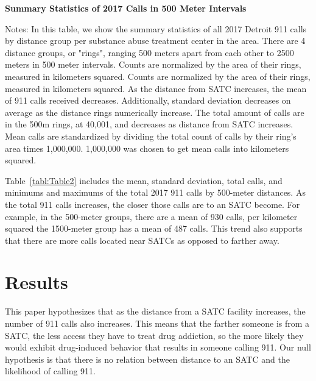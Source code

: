 \documentclass[12pt]{article}
\begin{document}
\begin{table}[hb!]
\centering
\scalebox{0.8}{
\centering

}
\caption{\textbf{Summary Statistics of 2017 Calls in 500 Meter Intervals}}
\label{tabl:Table2}
\centering\small{Notes: In this table, we show the summary statistics of all 2017 Detroit 911 calls by distance group per substance abuse treatment center in the area. There are 4 distance groups, or "rings", ranging 500 meters apart from each other to 2500 meters in 500 meter intervals. Counts are normalized by the area of their rings, measured in kilometers squared. Counts are normalized by the area of their rings, measured in kilometers squared. As the distance from SATC increases, the mean of 911 calls received decreases. Additionally, standard deviation decreases on average as the distance rings numerically increase. The total amount of calls are in the 500m rings, at 40,001, and decreases as distance from SATC increases. Mean calls are standardized by dividing the total count of calls by their ring's area times 1,000,000. 1,000,000 was chosen to get mean calls into kilometers squared. }
\end{table}

Table~\ref{tabl:Table2} includes the mean, standard deviation, total calls, and minimums and maximums of the total 2017 911 calls by 500-meter distances. As the total 911 calls increases, the closer those calls are to an SATC become. For example, in the 500-meter groups, there are a mean of 930 calls, per kilometer squared the 1500-meter group has a mean of 487 calls. This trend also supports that there are more calls located near SATCs as opposed to farther away. 



\section{Results}
\label{sec:result}

This paper hypothesizes that as the distance from a SATC facility increases, the number of 911 calls also increases. This means that the farther someone is from a SATC, the less access they have to treat drug addiction, so the more likely they would exhibit drug-induced behavior that results in someone calling 911. Our null hypothesis is that there is no relation between distance to an SATC and the likelihood of calling 911. 
\end{document}
